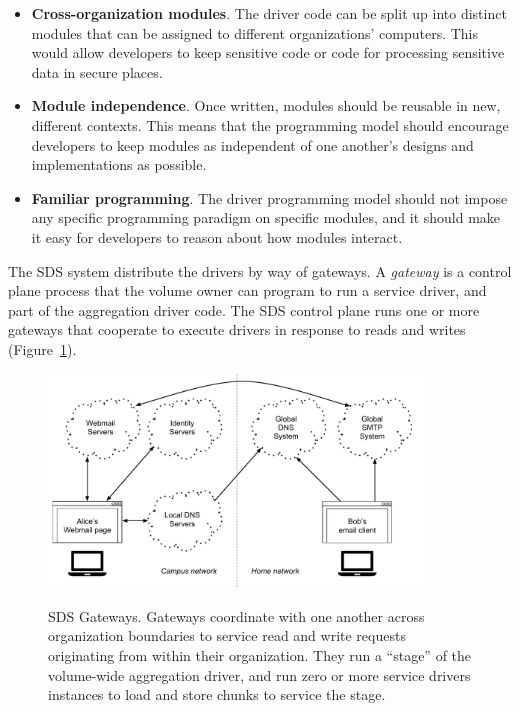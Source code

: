 \begin{itemize}
   \item \textbf{Cross-organization modules}.  The driver code
      can be split up into distinct modules that can be
      assigned to different organizations' computers.  This would allow
      developers to keep sensitive code or code for processing sensitive data
      in secure places.
   \item \textbf{Module independence}.  Once written, modules should be reusable in 
      new, different contexts.  This means that the programming model should
      encourage developers to keep modules as independent of one another's
      designs and implementations as possible.
   \item \textbf{Familiar programming}.  The driver programming model
      should not impose any specific programming paradigm on specific modules,
      and it should make it easy for developers to reason about how modules
      interact.
\end{itemize}

The SDS system distribute the drivers by way of gateways.
A \emph{gateway} is a control plane process that the
volume owner can program to run a service driver, and part of the aggregation driver code.  The SDS control plane
runs one or more gateways that cooperate to execute drivers in response
to reads and writes (Figure~\ref{fig:chap2-gateways}).

\begin{figure}[h]
   \caption{SDS Gateways.  Gateways coordinate with one another across
   organization boundaries to service read and write requests originating from
   within their organization.  They run a ``stage'' of the volume-wide aggregation driver,
   and run zero or more service drivers instances to load and store chunks to
   service the stage.}
   \centering
   \includegraphics[width=0.9\textwidth,page=6]{figures/dissertation-figures}
   \label{fig:chap2-gateways}
\end{figure}

